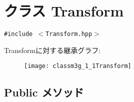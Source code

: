\hypertarget{classm3g_1_1Transform}{
\section{クラス Transform}
\label{classm3g_1_1Transform}
}
{\tt \#include $<$Transform.hpp$>$}

Transformに対する継承グラフ:\begin{figure}[H]
\begin{center}
\leavevmode
\texttt{[image: classm3g\_1\_1Transform]}
\end{center}
\end{figure}
\subsection*{Public メソッド}
